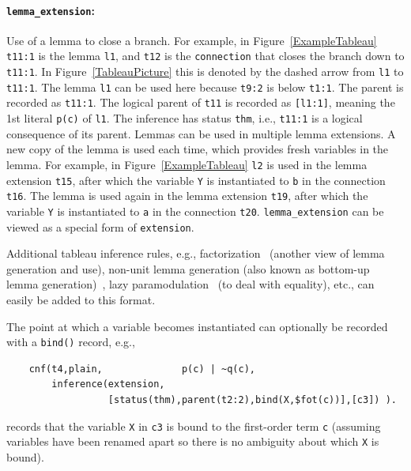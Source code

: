 \documentclass{ceurart}
\newcommand{\smalltt}[1]{\small \texttt{#1}}
\begin{document}
\paragraph{{\tt lemma\_extension}:} Use of a lemma to close a branch.
For example, in Figure~\ref{ExampleTableau} \smalltt{t11:1} is the lemma \smalltt{l1},
and \smalltt{t12} is the {\tt connection} that closes the branch down to \smalltt{t11:1}. 
In Figure~\ref{TableauPicture} this is denoted by the dashed arrow from \smalltt{l1} to 
\smalltt{t11:1}.
The lemma \smalltt{l1} can be used here because \smalltt{t9:2} is below \smalltt{t1:1}.
The parent is recorded as \smalltt{t11:1}.
The logical parent of \smalltt{t11} is recorded as \smalltt{[l1:1]}, meaning the 1st literal 
\smalltt{p(c)} of \smalltt{l1}.
The inference has status \smalltt{thm}, i.e., \smalltt{t11:1} is a logical consequence of its
parent.
Lemmas can be used in multiple lemma extensions.
A new copy of the lemma is used each time, which provides fresh variables in the lemma.
For example, in Figure~\ref{ExampleTableau} \smalltt{l2} is used in the lemma extension
\smalltt{t15}, after which the variable \smalltt{Y} is instantiated to \smalltt{b} in the
connection \smalltt{t16}. 
The lemma is used again in the lemma extension \smalltt{t19}, after which the variable 
\smalltt{Y} is instantiated to \smalltt{a} in the connection \smalltt{t20}.
{\tt lemma\_extension} can be viewed as a special form of {\tt extension}.

\vspace*{1em}
\noindent
Additional tableau inference rules, e.g., factorization~\cite{Joh93} (another view of lemma
generation and use), non-unit lemma generation (also known as bottom-up lemma 
generation)~\cite{AS92,Sch94}, lazy paramodulation~\cite{Pas08} (to deal with equality), 
etc., can easily be added to this format.

\vspace*{1em}
The point at which a variable becomes instantiated can optionally be recorded with a {\tt bind()} 
record, e.g., 
{\footnotesize
\begin{verbatim}
    cnf(t4,plain,              p(c) | ~q(c),
        inference(extension,
                  [status(thm),parent(t2:2),bind(X,$fot(c))],[c3]) ).
\end{verbatim}
}
\noindent
records that the variable \smalltt{X} in \smalltt{c3} is bound to the first-order term
\smalltt{c} (assuming variables have been renamed apart so there is no ambiguity about 
which \smalltt{X} is bound).
\end{document}
